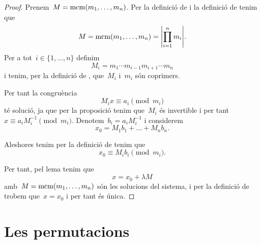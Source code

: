 \documentclass[../fonaments-de-les-matematiques.tex]{subfiles}
\begin{document}
    \begin{proof}
        Prenem~\(M=\operatorname{mcm}(m_{1},\dots,m_{n})\).
        Per la definició de  i la definició de  tenim que \[M=\mcm(m_{1},\dots,m_{n})=\abs{\prod_{i=1}^{n}m_{i}}.\]
        Per a tot~\(i\in\{1,\dots,n\}\) definim
        \[
            M_{i}=m_{1}\cdots m_{i-1}m_{i+1}\cdots m_{n}
        \]
        i tenim, per la definició de , que~\(M_{i}\) i~\(m_{i}\) són coprimers.

        Per tant la congruència
        \[
            M_{i}x\equiv a_{i}\pmod{m_{i}}
        \]
        té solució, ja que per la proposició  tenim que~\(M_{i}\) és invertible i per tant~\(x\equiv a_{i}M_{i}^{-1}\pmod{m_{i}}\).
        Denotem~\(b_{i}=a_{i}M_{i}^{-1}\) i considerem
        \[
            x_{0}=M_{1}b_{1}+\dots+M_{n}b_{n}.
        \]

        Aleshores tenim per la definició de  tenim que
        \[
            x_{0}\equiv M_{i}b_{i}\pmod{m_{i}}.
        \]

        Per tant, pel lema  tenim que
        \[
            x=x_{0}+\lambda M
        \]
        amb~\(M=\operatorname{mcm}(m_{1},\dots,m_{n})\) són les solucions del sistema, i per la definició de  trobem que~\(x=x_{0}\) i per tant és única.
    \end{proof}
\section{Les permutacions}
\end{document}
